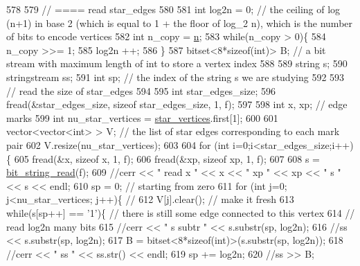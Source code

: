 \begin{DoxyCode}
578 
579   \textcolor{comment}{// ==== read star\_edges}
580 
581   \textcolor{keywordtype}{int} log2n = 0; \textcolor{comment}{// the ceiling of log (n+1) in base 2 (which is equal to 1 + the floor of log\_2 n), which
       is the number of bits to encode vertices}
582   \textcolor{keywordtype}{int} n\_copy = \hyperlink{classmarked__graph__compressed_a8d841016ddb11cfd33748c8deb6277ba}{n};
583   \textcolor{keywordflow}{while}(n\_copy > 0)\{
584     n\_copy >>= 1;
585     log2n ++;
586   \}
587   bitset<8*sizeof(int)> B; \textcolor{comment}{// a bit stream with maximum length of int to store a vertex index}
588 
589   \textcolor{keywordtype}{string} s;
590   stringstream ss;
591   \textcolor{keywordtype}{int} sp; \textcolor{comment}{// the index of the string s we are studying }
592 
593   \textcolor{comment}{// read the size of star\_edges}
594 
595   \textcolor{keywordtype}{int} star\_edges\_size;
596   fread(&star\_edges\_size, \textcolor{keyword}{sizeof} star\_edges\_size, 1, f);
597 
598   \textcolor{keywordtype}{int} x, xp; \textcolor{comment}{// edge marks}
599   \textcolor{keywordtype}{int} nu\_star\_vertices = \hyperlink{classmarked__graph__compressed_a7a4ced4586e2e353f9076bd447df5208}{star\_vertices}.first[1];
600 
601   vector<vector<int> > V; \textcolor{comment}{// the list of star edges corresponding to each mark pair}
602   V.resize(nu\_star\_vertices);
603 
604   \textcolor{keywordflow}{for} (\textcolor{keywordtype}{int} i=0;i<star\_edges\_size;i++)\{
605     fread(&x, \textcolor{keyword}{sizeof} x, 1, f);
606     fread(&xp, \textcolor{keyword}{sizeof} xp, 1, f);
607   
608     s = \hyperlink{compression__helper_8cpp_a40e8dcbc036f96b28e003e882c4890b7}{bit\_string\_read}(f);
609     \textcolor{comment}{//cerr << " read  x " << x << " xp " << xp << " s " << s << endl;}
610     sp = 0; \textcolor{comment}{// starting from zero }
611     \textcolor{keywordflow}{for} (\textcolor{keywordtype}{int} j=0; j<nu\_star\_vertices; j++)\{ \textcolor{comment}{// }
612       V[j].clear(); \textcolor{comment}{// make it fresh}
613       \textcolor{keywordflow}{while}(s[sp++] == \textcolor{charliteral}{'1'})\{ \textcolor{comment}{// there is still some edge connected to this vertex }
614         \textcolor{comment}{// read log2n many bits}
615         \textcolor{comment}{//cerr << " s subtr " << s.substr(sp, log2n);}
616         \textcolor{comment}{//ss << s.substr(sp, log2n);}
617         B = bitset<8*sizeof(int)>(s.substr(sp, log2n));
618         \textcolor{comment}{//cerr << " ss " << ss.str() << endl;}
619         sp += log2n;
620         \textcolor{comment}{//ss >> B;}

\end{DoxyCode}
